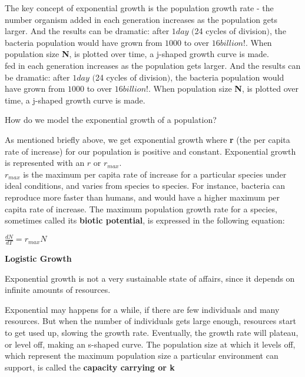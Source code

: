 \documentclass[a4paper,12pt]{report}
\numberwithin{equation}{section}
\begin{document}
The key concept of exponential growth is the population growth rate - the number organism added in each generation increases as the population gets larger. And the results can be dramatic: after $1day$ $($24 cycles of division$)$, the bacteria population would have grown from $1000$ to over $16billion!$. When population size \textbf{N}, is plotted over time, a j-shaped growth curve is made.\\
fed in each generation increases as the population gets larger. And the results can be dramatic: after $1day$ $($24 cycles of division$)$, the bacteria population would have grown from $1000$ to over $16billion!$. When population size \textbf{N}, is plotted over time, a j-shaped growth curve is made.\\

\begin{center}
\end{center}
\newpage
\begin{center}
How do we model the exponential growth of a population?\\
\end{center}

As mentioned briefly above, we get exponential growth where \textbf{r} (the per capita rate of increase) for our population is positive and constant. Exponential growth is represented with an $r$ or $r_{max}$.\\ 
$r_{max}$ is the maximum per capita rate of increase  for a particular species under ideal conditions, and varies from species to species. For instance, bacteria can reproduce more faster than humans, and would have a higher maximum per capita rate of increase. The maximum population growth rate for a species, sometimes called its \textbf{biotic potential}, is expressed in the following equation:\\

\begin{center}
$\frac{dN}{dT}=r_{max}N$
\end{center}

\textbf{Logistic Growth}

\indent Exponential growth is not a very sustainable state of affairs, since it depends on infinite amounts of resources.

\indent Exponential may happens for a while, if there are few individuals and many resources. But when the number of individuals gets large enough, resources start to get used up, slowing the growth rate. Eventually, the growth rate will plateau, or level off, making an s-shaped curve. The population size at which it levels off, which represent the maximum population size a particular environment can support, is called the \textbf{capacity carrying or k}
\end{document}
